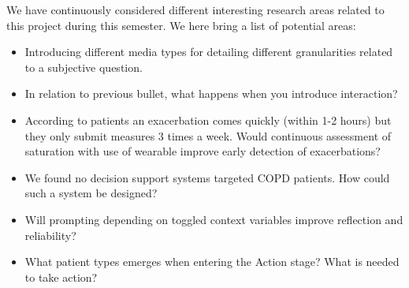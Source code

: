 We have continuously considered different interesting research areas related to this project during this semester. We here bring a list of potential areas:

\begin{itemize}
	\item Introducing different media types for detailing different granularities related to a subjective question.
	\item In relation to previous bullet, what happens when you introduce interaction? 
	\item According to patients an exacerbation comes quickly (within 1-2 hours) but they only submit measures 3 times a week. Would continuous assessment of saturation with use of wearable improve early detection of exacerbations?
	\item We found no decision support systems targeted COPD patients. How could such a system be designed?
	\item Will prompting depending on toggled context variables improve reflection and reliability?
	\item What patient types emerges when entering the Action stage? What is needed to take action?
\end{itemize}  